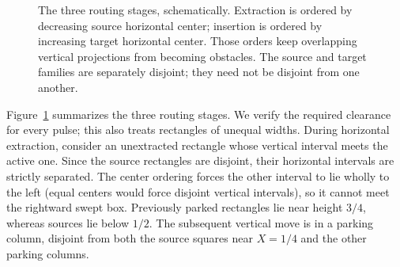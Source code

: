 \documentclass[11pt]{article}
\theoremstyle{remark}\newtheorem{remark}[theorem]{Remark}
\begin{document}
\begin{figure}[ht]
\centering
{}
\caption{The three routing stages, schematically.  Extraction is ordered
by decreasing source horizontal center; insertion is ordered by
increasing target horizontal center.  Those orders keep overlapping
vertical projections from becoming obstacles.  The source and target
families are separately disjoint; they need not be disjoint from one
another.}\label{fig:planar-routing}
\end{figure}

Figure~\ref{fig:planar-routing} summarizes the three routing stages.
We verify the required clearance for every pulse; this also treats
rectangles of unequal widths.  During horizontal extraction, consider
an unextracted rectangle whose vertical interval meets the active
one.  Since the source rectangles are disjoint, their horizontal
intervals are strictly separated.  The center ordering forces the
other interval to lie wholly to the left (equal centers would force
disjoint vertical intervals), so it cannot meet the
rightward swept box.  Previously parked rectangles lie near height
$3/4$, whereas sources lie below $1/2$.  The subsequent vertical
move is in a parking column, disjoint from both the source squares
near $X=1/4$ and the other parking columns.
\end{document}
